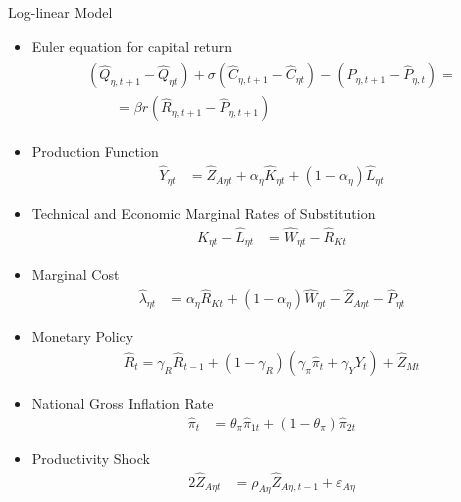 \documentclass[../quali_slides.tex]{subfiles}
\begin{document}
\begin{frame}[allowframebreaks]{Log-linear Model}
{\begin{itemize}
		\item Euler equation for capital return
		\begin{align}
			\begin{split}
				(\hat{Q}_{\eta, t+1} - \hat{Q}_{\eta t}) + \sigma(\hat{C}_{\eta, t+1} - \hat{C}_{\eta t}) - (\hat{P}_{\eta, t+1} - \hat{P}_{\eta, t}) = \\
				\qquad = \beta r_{}(\hat{R}_{\eta, t+1} - \hat{P}_{\eta, t+1})
			\end{split} \label{eq_v2:reg-ll-capital-euler-equation}
		\end{align}
		
		\item Production Function
		\begin{align}
			\hat{Y}_{\eta t} &= \hat{Z}_{A\eta t} + {\alpha_{\eta}} \hat{K}_{\eta t} + (1-\alpha_{\eta}) \hat{L}_{\eta t} \label{eq_v2:reg-ll-final-goods-firm-bundle-rule-3}
		\end{align}
		
		\item Technical and Economic Marginal Rates of Substitution %
		\begin{align}
			\hat{K}_{\eta t} - \hat{L}_{\eta t} &= \hat{W}_{\eta t} - \hat{R}_{K t} \label{eq_v2:reg-ll-int-good-firm-TMRS}
		\end{align}
		
		\item Marginal Cost
		\begin{align}
			\hat{\lambda}_{\eta t} &= {\alpha_{\eta}} \hat{R}_{Kt} + (1- {\alpha_{\eta}}) \hat{W}_{\eta t} - \hat{Z}_{A\eta t} - \hat{P}_{\eta t} \label{eq_v2:reg-ll-int-good-firm-MC-3}
		\end{align}
		
		\item Monetary Policy
		\begin{align}
			\hat{R}_t = \gamma_{R} \hat{R}_{t-1} + (1-\gamma_{R})(\gamma_{\pi} \hat{\pi}_t + \gamma_{Y} \hat{Y}_t) + \hat{Z}_{Mt} \label{eq_v2:reg-ll-monetary-policy}
		\end{align}
		
		\item National Gross Inflation Rate
		\begin{align}
			\hat{\pi}_{t} &= \theta_{\pi} \hat{\pi}_{1t} + (1 - \theta_{\pi}) \hat{\pi}_{2t} \label{eq_v2:reg-gross-inflation-rate-ll}
		\end{align}
		
		\item Productivity Shock
		\begin{alignat}{2}
			\hat{Z}_{A\eta t} &= \rho_{A\eta} \hat{Z}_{A\eta, t-1} + \varepsilon_{A\eta} \label{eq_v2:reg-ll-productivity-shock}
		\end{alignat}
		

\end{itemize}}
\end{frame}
\end{document}
